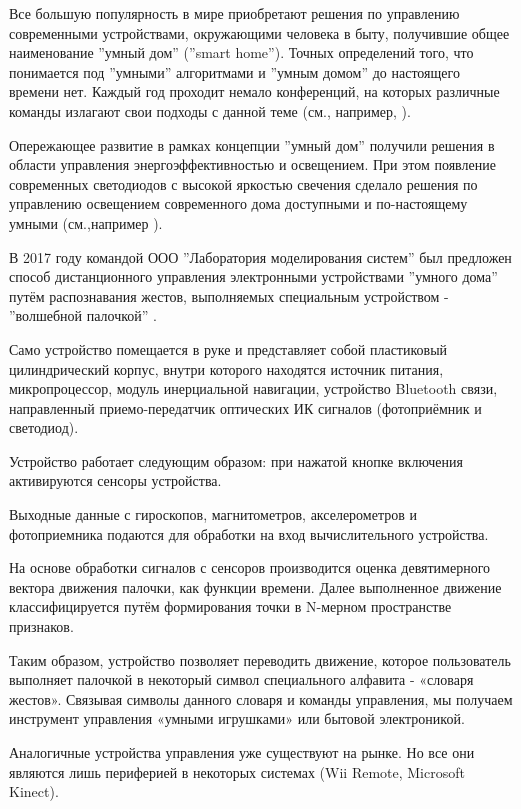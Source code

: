 \Introduction
Все большую популярность в мире приобретают решения по управлению современными устройствами, окружающими человека в быту, получившие общее наименование ''умный дом'' (''smart home''). Точных определений того, что понимается под ''умными'' алгоритмами и ''умным домом''  до настоящего времени нет. Каждый год проходит немало конференций, на которых различные команды излагают свои подходы с данной теме (см., например, \cite{Raisul2012}).

Опережающее развитие в рамках концепции ''умный дом'' получили решения в области управления энергоэффективностью и освещением.  При этом появление современных светодиодов с высокой яркостью свечения сделало решения по управлению освещением современного дома доступными и по-настоящему умными (см.,например \cite{Kumar2017}). 

В 2017 году командой ООО ''Лаборатория моделирования систем'' был  предложен  способ дистанционного управления электронными устройствами ''умного дома'' путём распознавания жестов, выполняемых специальным устройством - ''волшебной палочкой'' \cite{belyaikina2017}.

Само устройство помещается в руке и представляет собой пластиковый цилиндрический корпус, внутри которого находятся источник питания, микропроцессор, модуль инерциальной навигации, устройство Bluetooth связи, направленный приемо-передатчик оптических ИК сигналов (фотоприёмник и светодиод).

Устройство работает следующим образом: при нажатой кнопке включения активируются сенсоры устройства. 

Выходные данные с гироскопов, магнитометров,  акселерометров и фотоприемника подаются для обработки  на вход вычислительного устройства.  

На основе обработки сигналов с сенсоров производится оценка девятимерного вектора движения палочки, как функции времени.  
Далее выполненное движение классифицируется путём  формирования точки в N-мерном пространстве признаков.

Таким образом, устройство позволяет переводить движение, которое пользователь выполняет палочкой в некоторый символ специального алфавита - «словаря жестов». 
Связывая символы данного словаря и команды управления, мы получаем инструмент  управления «умными игрушками» или бытовой электроникой.

Аналогичные устройства управления уже существуют на рынке. 
Но все они являются лишь периферией в некоторых системах (Wii Remote, Microsoft Kinect). 


